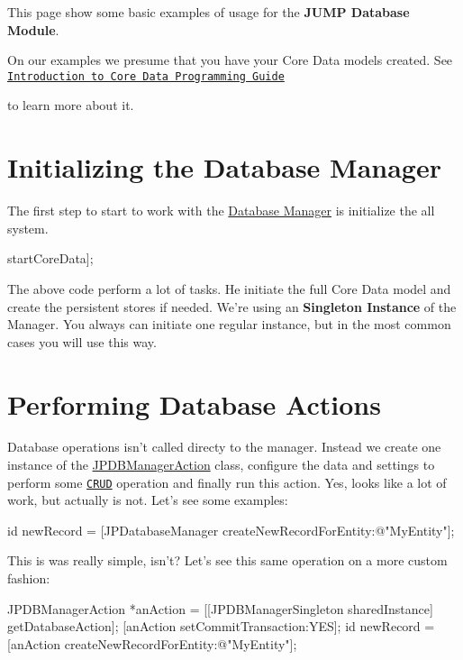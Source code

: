 This page show some basic examples of usage for the {\bfseries JUMP Database Module}.\par
 \par
 On our examples we presume that you have your Core Data models created. See \href{http://developer.apple.com/library/mac/#documentation/cocoa/conceptual/CoreData/cdProgrammingGuide.html}{\tt Introduction to Core Data Programming Guide} \par
 to learn more about it.\par
 \par
\hypertarget{basic_uses_init_manager}{}\section{Initializing the Database Manager}\label{basic_uses_init_manager}
The first step to start to work with the \hyperlink{interface_j_p_d_b_manager}{Database Manager} is initialize the all system. 
\begin{DoxyCode}
 [[JPDBManagerSingleton sharedInstance] startCoreData];
\end{DoxyCode}
 The above code perform a lot of tasks. He initiate the full Core Data model and create the persistent stores if needed. We're using an {\bfseries Singleton Instance} of the Manager. You always can initiate one regular instance, but in the most common cases you will use this way.\hypertarget{basic_uses_db_action}{}\section{Performing Database Actions}\label{basic_uses_db_action}
Database operations isn't called directy to the manager. Instead we create one instance of the \hyperlink{interface_j_p_d_b_manager_action}{JPDBManagerAction} class, configure the data and settings to perform some \href{http://en.wikipedia.org/wiki/Create,_read,_update_and_delete}{\tt CRUD} operation and finally run this action. Yes, looks like a lot of work, but actually is not. Let's see some examples: 
\begin{DoxyCode}
 id newRecord = [JPDatabaseManager createNewRecordForEntity:@"MyEntity"];
\end{DoxyCode}
 This is was really simple, isn't? Let's see this same operation on a more custom fashion: 
\begin{DoxyCode}
 JPDBManagerAction *anAction = [[JPDBManagerSingleton sharedInstance] 
      getDatabaseAction];
 [anAction setCommitTransaction:YES];
 id newRecord = [anAction createNewRecordForEntity:@"MyEntity"];
\end{DoxyCode}
